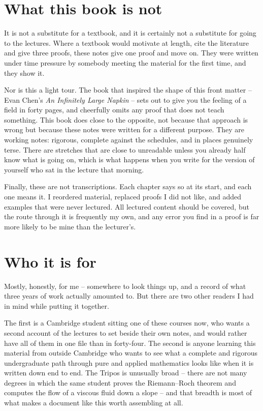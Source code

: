 \section*{What this book is not}

It is not a substitute for a textbook, and it is certainly not a substitute for going
to the lectures. Where a textbook would motivate at length, cite the literature and
give three proofs, these notes give one proof and move on. They were written under time
pressure by somebody meeting the material for the first time, and they show it.

Nor is this a light tour. The book that inspired the shape of this front matter --
Evan Chen's \emph{An Infinitely Large Napkin} -- sets out to give you the feeling of a
field in forty pages, and cheerfully omits any proof that does not teach something.
This book does close to the opposite, not because that approach is wrong but because
these notes were written for a different purpose. They are working notes: rigorous,
complete against the schedules, and in places genuinely terse. There are stretches that
are close to unreadable unless you already half know what is going on, which is what
happens when you write for the version of yourself who sat in the lecture that morning.

Finally, these are not transcriptions. Each chapter says so at its start, and each one
means it. I reordered material, replaced proofs I did not like, and added examples that
were never lectured. All lectured content should be covered, but the route through it
is frequently my own, and any error you find in a proof is far more likely to be mine
than the lecturer's.

\section*{Who it is for}

Mostly, honestly, for me -- somewhere to look things up, and a record of what three
years of work actually amounted to. But there are two other readers I had in mind while
putting it together.

The first is a Cambridge student sitting one of these courses now, who wants a second
account of the lectures to set beside their own notes, and would rather have all of
them in one file than in forty-four. The second is anyone learning this material from
outside Cambridge who wants to see what a complete and rigorous undergraduate path
through pure and applied mathematics looks like when it is written down end to end. The
Tripos is unusually broad -- there are not many degrees in which the same student
proves the Riemann--Roch theorem and computes the flow of a viscous fluid down a
slope -- and that breadth is most of what makes a document like this worth assembling
at all.

